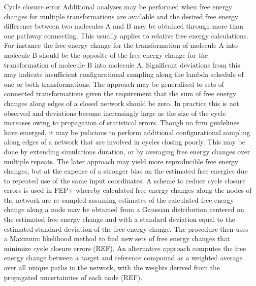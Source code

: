 \documentclass[9pt,bestpractices]{livecoms}
\begin{document}
Cycle closure error
Additional analyses may be performed when free energy changes for multiple transformations are available and the desired free energy difference between two molecules A and B may be obtained through more than one pathway connecting. This usually applies to relative free energy calculations. 
For instance the free energy change for the transformation of molecule A into molecule B should be the opposite of the free energy change for the transformation of molecule B into molecule A. Significant deviations from this may indicate insufficient configurational sampling along the lambda schedule of one or both transformations. The approach may be generalised to sets of connected transformations given the requirement that the sum of free energy changes along edges of a closed network should be zero. In practice this is not observed and deviations become increasingly large as the size of the cycle increases owing to propagation of statistical errors. Though no firm guidelines have emerged, it may be judicious to perform additional configurational sampling along edges of a network that are involved in cycles closing poorly. This may be done by extending simulations duration, or by averaging free energy changes over multiple repeats. The later approach may yield more reproducible free energy changes, but at the expense of a stronger bias on the estimated free energies due to repeated use of the same input coordinates. 
A scheme to reduce cycle closure errors is used in FEP+ whereby calculated free energy changes along the nodes of the network are re-sampled assuming estimates of the calculated free energy change along a node may be obtained from a Gaussian distribution centered on the estimated free energy change and with a standard deviation equal to the estimated standard deviation of the free energy change. The procedure then uses a Maximum likelihood method to find new sets of free energy changes that minimize cycle closure errors (REF). An alternative approach computes the free energy change between a target and reference compound as a weighted average over all unique paths in the network, with the weights derived from the propagated uncertainties of each node (REF). 
\end{document}
